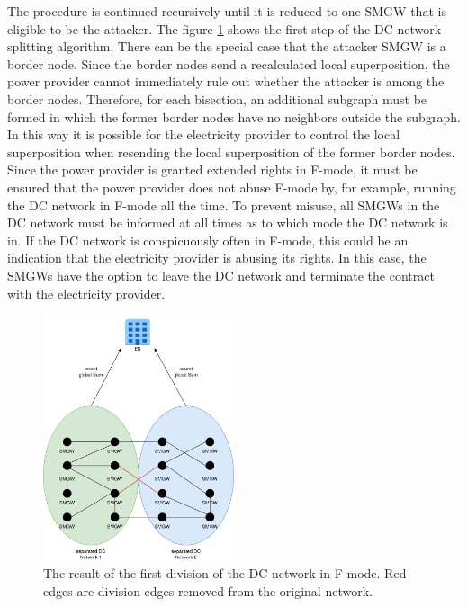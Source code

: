 The procedure is continued recursively until it is reduced to one \gls{SMGW} that is eligible to be the attacker. The figure \ref{fig:FirstSplitting} shows the first step of the DC network splitting algorithm.
There can be the special case that the attacker \gls{SMGW} is a border node. Since the border nodes send a recalculated local superposition, the power provider cannot immediately rule out whether the attacker is among the border nodes. Therefore, for each bisection, an additional subgraph must be formed in which the former border nodes have no neighbors outside the subgraph. In this way it is possible for the electricity provider to control the local superposition when resending the local superposition of the former border nodes. \\
Since the power provider is granted extended rights in F-mode, it must be ensured that the power provider does not abuse F-mode by, for example, running the DC network in F-mode all the time. To prevent misuse, all \gls{SMGW}s in the DC network must be informed at all times as to which mode the DC network is in. If the DC network is conspicuously often in F-mode, this could be an indication that the electricity provider is abusing its rights. In this case, the \gls{SMGW}s have the option to leave the DC network and terminate the contract with the electricity provider.
\begin{figure}[tbp]
  \centering
  \includegraphics[width=0.5\textwidth]{images/DC Net Split2.png}
  \caption[DC Network Splitting Algorithm]{The result of the first division of the DC network in F-mode. Red edges are division edges removed from the original network.}
  \label{fig:FirstSplitting}
\end{figure}
